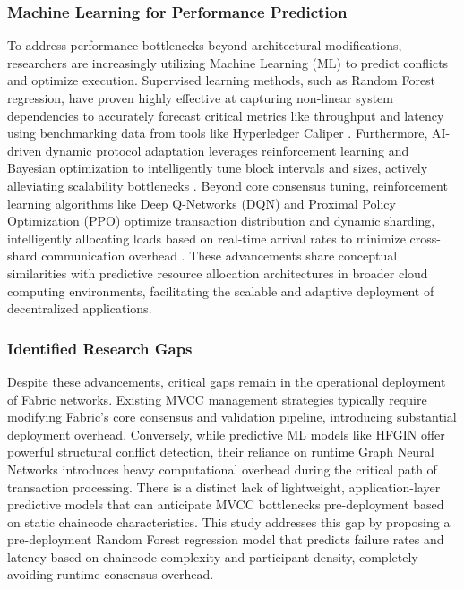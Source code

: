 \documentclass[12pt]{article}
\begin{document}
\subsubsection{Machine Learning for Performance Prediction}

To address performance bottlenecks beyond architectural modifications, researchers are increasingly utilizing Machine Learning (ML) to predict conflicts and optimize execution. Supervised learning methods, such as Random Forest regression, have proven highly effective at capturing non-linear system dependencies to accurately forecast critical metrics like throughput and latency using benchmarking data from tools like Hyperledger Caliper \cite{Deshinta_Predicting_2025}. Furthermore, AI-driven dynamic protocol adaptation leverages reinforcement learning and Bayesian optimization to intelligently tune block intervals and sizes, actively alleviating scalability bottlenecks \cite{Manjula_Scalability_2025}. Beyond core consensus tuning, reinforcement learning algorithms like Deep Q-Networks (DQN) and Proximal Policy Optimization (PPO) optimize transaction distribution and dynamic sharding, intelligently allocating loads based on real-time arrival rates to minimize cross-shard communication overhead \cite{Mutum_Dynamic_2025}. These advancements share conceptual similarities with predictive resource allocation architectures in broader cloud computing environments, facilitating the scalable and adaptive deployment of decentralized applications.

\subsubsection{Identified Research Gaps}

Despite these advancements, critical gaps remain in the operational deployment of Fabric networks. Existing MVCC management strategies typically require modifying Fabric's core consensus and validation pipeline, introducing substantial deployment overhead. Conversely, while predictive ML models like HFGIN offer powerful structural conflict detection, their reliance on runtime Graph Neural Networks introduces heavy computational overhead during the critical path of transaction processing. There is a distinct lack of lightweight, application-layer predictive models that can anticipate MVCC bottlenecks pre-deployment based on static chaincode characteristics. This study addresses this gap by proposing a pre-deployment Random Forest regression model that predicts failure rates and latency based on chaincode complexity and participant density, completely avoiding runtime consensus overhead.
\end{document}
